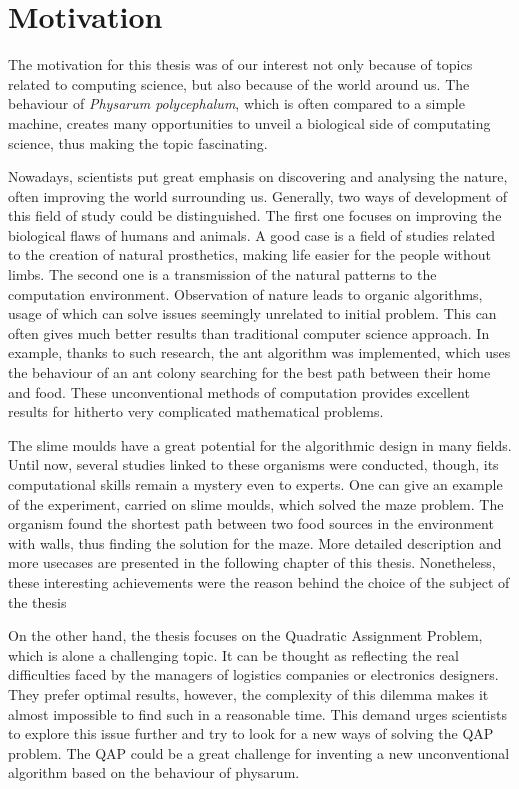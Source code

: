 \section{Motivation}
\label{section:introduction_motivation}

The motivation for this thesis was of our interest not only because of topics related to computing science, but also because of the world around us. The behaviour of \textit{Physarum polycephalum}, which is often compared to a simple machine, creates many opportunities to unveil a biological side of computating science, thus making the topic fascinating.

Nowadays, scientists put great emphasis on discovering and analysing the nature, often improving the world surrounding us. Generally, two ways of development of this field of study could be distinguished. The first one focuses on improving the biological flaws of humans and animals. A good case is a field of studies related to the creation of natural prosthetics, making life easier for the people without limbs. The second one is a transmission of the natural patterns to the computation environment. Observation of nature leads to organic algorithms, usage of which can solve issues seemingly unrelated to initial problem. This can often gives much better results than traditional computer science approach. In example, thanks to such research, the ant algorithm was implemented, which uses the behaviour of an ant colony searching for the best path between their home and food. These unconventional methods of computation provides excellent results for hitherto very complicated mathematical problems.

The slime moulds have a great potential for the algorithmic design in many fields. Until now, several studies linked to these organisms were conducted, though, its computational skills remain a mystery even to experts. One can give an example of the experiment, carried on slime moulds, which solved the maze problem. The organism found the shortest path between two food sources in the environment with walls, thus finding the solution for the maze. More detailed description and more usecases are presented in the following chapter of this thesis. Nonetheless, these interesting achievements were the reason behind the choice of the subject of the thesis

On the other hand, the thesis focuses on the Quadratic Assignment Problem, which is alone a challenging topic. It can be thought as reflecting the real difficulties faced by the managers of logistics companies or electronics designers. They prefer optimal results, however, the complexity of this dilemma makes it almost impossible to find such in a reasonable time. This demand urges scientists to explore this issue further and try to look for a new ways of solving the QAP problem.
The QAP could be a great challenge for inventing a new unconventional algorithm based on the behaviour of physarum.

